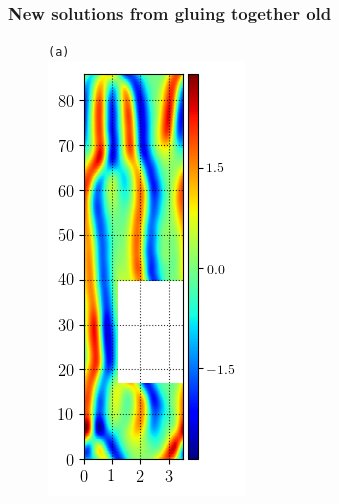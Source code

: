 \documentclass[mathserif, handout]{beamer}
\begin{document}
\begin{frame}
\frametitle{New solutions from gluing together old}
\begin{figure}
\begin{minipage}[height=.48\textheight]{.48\textwidth}
\centering \small{\texttt{(a)}}\\
\includegraphics[width=.8\textwidth,height=.4\textheight]{MNG_ppo_without_HalfD}
\end{minipage}
\begin{minipage}[height=.48\textheight]{.48\textwidth}

\end{minipage}
\end{figure}
\end{frame}
\end{document}
